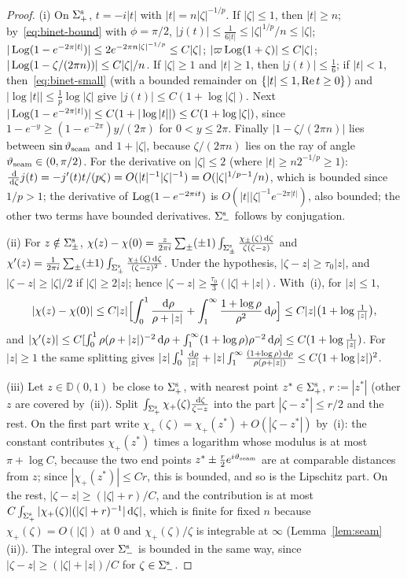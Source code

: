 \begin{proof}
(i) On $\Sigma^{\mathrm{s}}_+$, $t=-i|t|$ with $|t|=n|\zeta|^{-1/p}$. If $|\zeta|\le1$, then $|t|\ge n$; by~\eqref{eq:binet-bound} with
$\phi=\pi/2$, $|j(t)|\le\frac1{6|t|}\le|\zeta|^{1/p}/n\le|\zeta|$; $|\operatorname{Log}(1-e^{-2\pi|t|})|\le2e^{-2\pi n|\zeta|^{-1/p}}\le C|\zeta|$;
$|\varpi\operatorname{Log}(1+\zeta)|\le C|\zeta|$; $|\operatorname{Log}(1-\zeta/(2\pi n))|\le C|\zeta|/n$. If $|\zeta|\ge1$ and $|t|\ge1$, then
$|j(t)|\le\frac16$; if $|t|<1$, then~\eqref{eq:binet-small} (with a bounded remainder on $\{|t|\le1,\operatorname{Re} t\ge0\}$) and
$|\log|t||\le\frac1p\log|\zeta|$ give $|j(t)|\le C(1+\log|\zeta|)$. Next $|\operatorname{Log}(1-e^{-2\pi|t|})|\le C(1+|\log|t||)\le
C(1+\log|\zeta|)$, since $1-e^{-y}\ge(1-e^{-2\pi})y/(2\pi)$ for $0<y\le2\pi$. Finally $|1-\zeta/(2\pi n)|$ lies between
$\sin\vartheta_{\mathrm{seam}}$ and $1+|\zeta|$, because $\zeta/(2\pi n)$ lies on the ray of angle $\vartheta_{\mathrm{seam}}\in(0,\pi/2)$. For the derivative on
$|\zeta|\le2$ (where $|t|\ge n2^{-1/p}\ge1$): $\frac{\,\mathrm{d}}{\,\mathrm{d}\zeta}j(t)=-j'(t)t/(p\zeta)=O(|t|^{-1}|\zeta|^{-1})=
O(|\zeta|^{1/p-1}/n)$, which is bounded since $1/p>1$; the derivative of $\operatorname{Log}(1-e^{-2\pi it})$ is
$O(|t||\zeta|^{-1}e^{-2\pi|t|})$, also bounded; the other two terms have bounded derivatives. $\Sigma^{\mathrm{s}}_-$ follows by
conjugation.

(ii) For $z\notin\Sigma^{\mathrm{s}}_\pm$,
$\chi(z)-\chi(0)=\frac z{2\pi i}\sum_\pm(\pm1)\int_{\Sigma^{\mathrm{s}}_\pm}\frac{\chi_\pm(\zeta)\,\mathrm{d}\zeta}{\zeta(\zeta-z)}$ and
$\chi'(z)=\frac1{2\pi i}\sum_\pm(\pm1)\int_{\Sigma^{\mathrm{s}}_\pm}\frac{\chi_\pm(\zeta)\,\mathrm{d}\zeta}{(\zeta-z)^2}$. Under the hypothesis,
$|\zeta-z|\ge\tau_0|z|$, and $|\zeta-z|\ge|\zeta|/2$ if $|\zeta|\ge2|z|$; hence $|\zeta-z|\ge\frac{\tau_0}3(|\zeta|+|z|)$.
With~(i), for $|z|\le1$,
\[
  |\chi(z)-\chi(0)|\le C|z|\Bigl[\int_0^1\frac{\,\mathrm{d}\rho}{\rho+|z|}+\int_1^\infty\frac{1+\log\rho}{\rho^2}\,\mathrm{d}\rho\Bigr]\le
  C|z|\bigl(1+\log\tfrac1{|z|}\bigr),
\]
and $|\chi'(z)|\le C[\int_0^1\rho(\rho+|z|)^{-2}\,\mathrm{d}\rho+\int_1^\infty(1+\log\rho)\rho^{-2}\,\mathrm{d}\rho]\le C(1+\log\frac1{|z|})$.
For $|z|\ge1$ the same splitting gives
$|z|\int_0^1\frac{\,\mathrm{d}\rho}{|z|}+|z|\int_1^\infty\frac{(1+\log\rho)\,\mathrm{d}\rho}{\rho(\rho+|z|)}\le C(1+\log|z|)^2$.

(iii) Let $z\in \mathbb D(0,1)$ be close to $\Sigma^{\mathrm{s}}_+$, with nearest point $z^*\in\Sigma^{\mathrm{s}}_+$, $r:=|z^*|$ (other $z$ are covered
by~(ii)). Split $\int_{\Sigma^{\mathrm{s}}_+}\chi_+(\zeta)\frac{\,\mathrm{d}\zeta}{\zeta-z}$ into the part $|\zeta-z^*|\le r/2$ and the rest. On
the first part write $\chi_+(\zeta)=\chi_+(z^*)+O(|\zeta-z^*|)$ by~(i): the constant contributes $\chi_+(z^*)$ times a
logarithm whose modulus is at most $\pi+\log C$, because the two end points $z^*\pm\frac r2e^{i\vartheta_{\mathrm{seam}}}$ are at comparable
distances from $z$; since $|\chi_+(z^*)|\le Cr$, this is bounded, and so is the Lipschitz part. On the rest,
$|\zeta-z|\ge(|\zeta|+r)/C$, and the contribution is at most $C\int_{\Sigma^{\mathrm{s}}_+}|\chi_+(\zeta)|(|\zeta|+r)^{-1}|\,\mathrm{d}\zeta|$, which
is finite for fixed $n$ because $\chi_+(\zeta)=O(|\zeta|)$ at $0$ and $\chi_+(\zeta)/\zeta$ is integrable at $\infty$
(Lemma~\ref{lem:seam}(ii)). The integral over $\Sigma^{\mathrm{s}}_-$ is bounded in the same way, since
$|\zeta-z|\ge(|\zeta|+|z|)/C$ for $\zeta\in\Sigma^{\mathrm{s}}_-$.
\end{proof}
